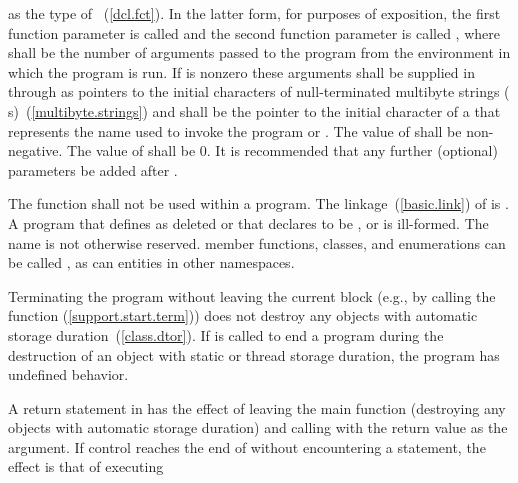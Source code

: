 %
%
as the type of ~(\ref{dcl.fct}).
%
%
In the latter form, for purposes of exposition, the first function
parameter is called  and the second function parameter is
called , where  shall be the number of
arguments passed to the program from the environment in which the
program is run. If
 is nonzero these arguments shall be supplied in
 through  as pointers to the initial
characters of null-terminated multibyte strings (\ntmbs
s)~(\ref{multibyte.strings}) and  shall be the pointer to
the initial character of a \ntmbs that represents the name used to
invoke the program or . The value of  shall be
non-negative. The value of  shall be 0. \enternote It
is recommended that any further (optional) parameters be added after
. \exitnote

\pnum
The function  shall not be used within
a program.
%
The linkage~(\ref{basic.link}) of  is
. A program that defines  as
deleted or that declares  to be
 , or  is ill-formed. The name  is
not otherwise reserved. \enterexample member functions, classes, and
enumerations can be called , as can entities in other
namespaces. \exitexample

\pnum
{}%
%
%
Terminating the program
without leaving the current block (e.g., by calling the function
 (\ref{support.start.term})) does not destroy any
objects with automatic storage duration~(\ref{class.dtor}). If
 is called to end a program during the destruction of
an object with static or thread storage duration, the program has undefined
behavior.

\pnum
{}%
%
A return statement in  has the effect of leaving the main
function (destroying any objects with automatic storage duration) and
calling  with the return value as the argument. If
control reaches the end of  without encountering a
 statement, the effect is that of executing

